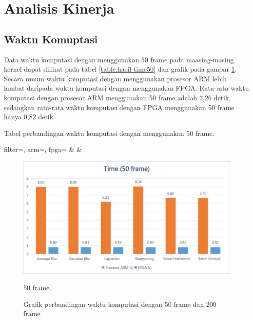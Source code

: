 \section{Analisis Kinerja}
\subsection{Waktu Komuptasi}

Data waktu komputasi dengan menggunakan 50 frame pada maasing-masing kernel dapat dilihat pada tabel \ref{table:hasil-time50} dan grafik pada gambar \ref{fig:chart-time50}. Secara umum waktu komputasi dengan menggunakan prosesor ARM lebih lambat daripada waktu komputasi dengan menggunakan FPGA. Rata-rata waktu komputasi dengan prosesor ARM menggunakan 50 frame adalah 7,26 detik, sedangkan rata-rata waktu komputasi dengan FPGA menggunakan 50 frame hanya 0,82 detik.
\begin{atable}
    \caption{Tabel perbandingan waktu komputasi dengan menggunakan 50 frame.}
    \label{table:hasil-time50}
        {
            filter=\filter, 
            arm=\arm, 
            fpga=\fpga}
        {
            \filter & 
            \arm & 
            \fpga }
\end{atable}
\begin{figure}[H]
    \centering
    \includegraphics[width=0.81\linewidth, center]{images/chart/chart-time50.png}
    \caption{50 frame.}
    \label{fig:chart-time50}
    \caption{Grafik perbandingan waktu komputasi dengan 50 frame dan 200 frame}
\end{figure}

